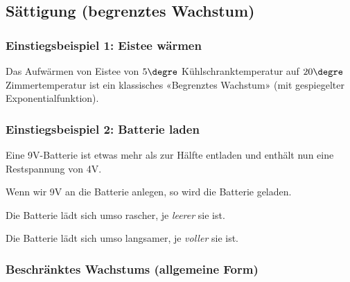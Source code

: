 

\newpage


\subsection{Sättigung (begrenztes Wachstum)}
\subsubsection{Einstiegsbeispiel 1: Eistee wärmen}
Das Aufwärmen von Eistee von $5\degre$ Kühlschranktemperatur auf $20\degre$ Zimmertemperatur ist ein klassisches «Begrenztes Wachstum» (mit gespiegelter Exponentialfunktion).


\subsubsection{Einstiegsbeispiel 2: Batterie laden}
\begin{center}
\end{center}

Eine 9V-Batterie ist etwas mehr als zur Hälfte entladen und enthält nun eine
Restspannung von 4V.

Wenn wir 9V an die Batterie anlegen, so wird die Batterie geladen.

Die Batterie lädt sich umso rascher, je \textit{leerer} sie ist.

Die Batterie lädt sich umso langsamer, je \textit{voller} sie ist.


\newpage

\subsubsection{Beschränktes Wachstums (allgemeine Form)}

